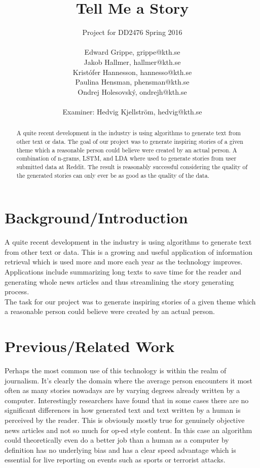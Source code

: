 \documentclass[12pt,a4paper,utf8]{article}
\title{Tell Me a Story}
\author{Project for DD2476 Spring 2016\\\\Edward Grippe, grippe@kth.se\\Jakob Hallmer, hallmer@kth.se\\Kristófer Hannesson, hannesso@kth.se\\Paulina Hensman, phensman@kth.se\\Ondrej Holesovský, ondrejh@kth.se\\\\ Examiner: Hedvig Kjellström, hedvig@kth.se}
\begin{document}
\maketitle
\thispagestyle{empty}
\clearpage


\begin{abstract}
A quite recent development in the industry is using algorithms to generate text from other text or data. The goal of our project was to generate inspiring stories of a given theme which a reasonable person could believe were created by an actual person. A combination of n-grams, LSTM, and LDA where used to generate stories from user submitted data at Reddit. The result is reasonably successful considering the quality of the generated stories can only ever be as good as the quality of the data.
\end{abstract}
\pagebreak


\pagestyle{plain}
\tableofcontents
\cleardoublepage
\pagebreak




\setcounter{page}{1}
\setcounter{secnumdepth}{3}

\section{Background/Introduction}
A quite recent development in the industry is using algorithms to generate text from other text or data. This is a growing and useful application of information retrieval which is used more and more each year as the technology improves. Applications include summarizing long texts to save time for the reader and generating whole news articles and thus streamlining the story generating process\autocite{RobotJournalist}.\\

The task for our project was to generate inspiring stories of a given theme which a reasonable person could believe were created by an actual person.

\section{Previous/Related Work}
Perhaps the most common use of this technology is within the realm of journalism. It's clearly the domain where the average person encounters it most often as many stories nowadays are by varying degrees already written by a computer. Interestingly researchers have found that in some cases there are no significant differences in how generated text and text written by a human is perceived by the reader\autocite{RobotJournalist}. This is obviously mostly true for genuinely objective news articles and not so much for op-ed style content. In this case an algorithm could theoretically even do a better job than a human as a computer by definition has no underlying bias and has a clear speed advantage which is essential for live reporting on events such as sports or terrorist attacks.\\
\end{document}
